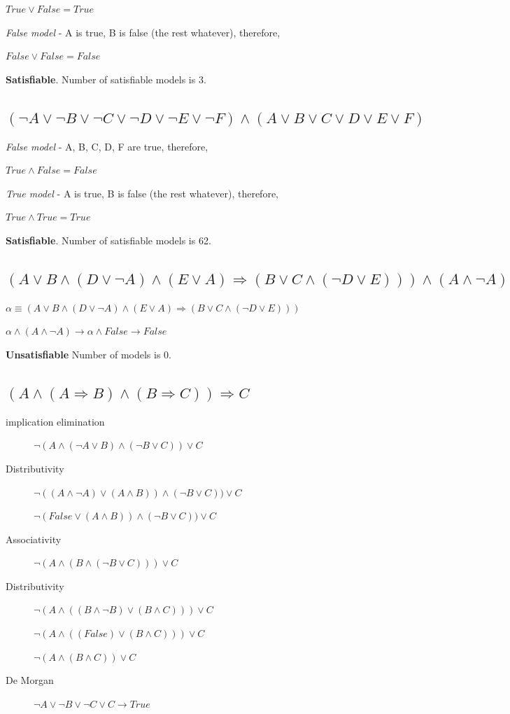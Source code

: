 \documentclass{article}                     %
\newcommand{\nt}[1]{\neg #1}
\begin{document}
	$ True \lor False = True$
	
	\textit{False model} - A is true, B is false (the rest whatever), therefore,

	$ False \lor False = False $
	
	\textbf{Satisfiable}. Number of satisfiable models is 3.
	\subsection{$ (\nt{A} \lor \nt{B} \lor \nt{C} \lor \nt{D} \lor \nt{E} \lor \nt{F}) \land (A \lor B \lor C \lor D \lor E \lor F)$}
	\textit{False model} - A, B, C, D, F are true, therefore,
	
	$ True \land False = False$
	
	\textit{True model} - A is true, B is false (the rest whatever), therefore,
	
	$ True \land True = True $
	
	\textbf{Satisfiable}. Number of satisfiable models is 62.
	
	\subsection{$ (A \lor B \land (D \lor \nt{A}) \land (E \lor A) \Rightarrow  (B \lor C \land (\nt{D} \lor E))) \land (A \land \nt{A})$}
	
	$ \alpha \equiv (A \lor B \land (D \lor \nt{A}) \land (E \lor A) \Rightarrow  (B \lor C \land (\nt{D} \lor E))) $
	
	
	$ \alpha \land (A \land \nt{A}) \rightarrow \alpha \land False \rightarrow False $
	
	\textbf{Unsatisfiable}  Number of models is 0.
	
	\subsection{$ (A \land (A \Rightarrow B) \land (B \Rightarrow C)) \Rightarrow C $}

	\begin{description}
		\item [implication elimination]
		$ \neg (A \land (\nt{A} \lor B) \land (\nt{B} \lor C)) \lor C  $
		\item [Distributivity]
		$ \neg ((A \land \nt{A}) \lor (A \land B)) \land (\nt{B} \lor C)) \lor C  $
		
		$ \neg (False \lor (A \land B)) \land (\nt{B} \lor C)) \lor C  $
		\item [Associativity]
		$ \neg (A \land (B \land (\nt{B} \lor C))) \lor C  $
		\item [Distributivity]
		$ \neg (A \land ((B \land \nt{B}) \lor (B \land C))) \lor C  $
		
		$ \neg (A \land ((False) \lor (B \land C))) \lor C  $

		$ \neg (A \land (B \land C)) \lor C  $
		\item[De Morgan]
		$ \nt{A} \lor \nt{B} \lor \nt{C} \lor C \rightarrow True $
	\end{description}
\end{document}
